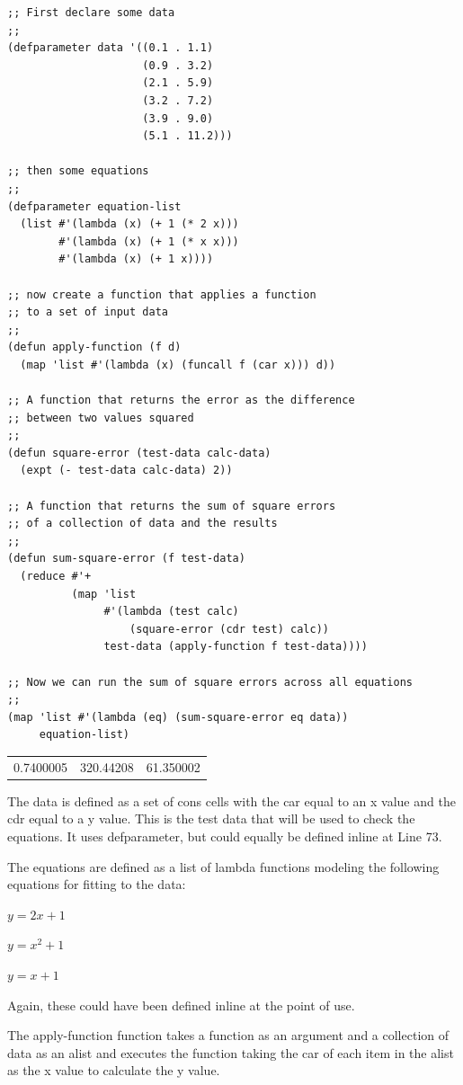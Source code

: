 \documentclass[11pt]{article}
\begin{document}
\begin{verbatim}
;; First declare some data
;;
(defparameter data '((0.1 . 1.1)
                     (0.9 . 3.2)
                     (2.1 . 5.9)
                     (3.2 . 7.2)
                     (3.9 . 9.0)
                     (5.1 . 11.2)))

;; then some equations
;;
(defparameter equation-list
  (list #'(lambda (x) (+ 1 (* 2 x)))
        #'(lambda (x) (+ 1 (* x x)))
        #'(lambda (x) (+ 1 x))))

;; now create a function that applies a function
;; to a set of input data
;;
(defun apply-function (f d)
  (map 'list #'(lambda (x) (funcall f (car x))) d))

;; A function that returns the error as the difference
;; between two values squared
;;
(defun square-error (test-data calc-data)
  (expt (- test-data calc-data) 2))

;; A function that returns the sum of square errors
;; of a collection of data and the results
;;
(defun sum-square-error (f test-data)
  (reduce #'+
          (map 'list
               #'(lambda (test calc)
                   (square-error (cdr test) calc))
               test-data (apply-function f test-data))))

;; Now we can run the sum of square errors across all equations
;;
(map 'list #'(lambda (eq) (sum-square-error eq data))
     equation-list)
\end{verbatim}
\begin{center}
\begin{tabular}{rrr}
0.7400005 & 320.44208 & 61.350002\\
\end{tabular}
\end{center}

The data is defined as a set of cons cells with the car equal to an x
value and the cdr equal to a y value. This is the test data that will
be used to check the equations. It uses defparameter, but could
equally be defined inline at Line 73.

The equations are defined as a list of lambda functions modeling the
following equations for fitting to the data:

$y=2x+1$

$y=x^2+1$

$y=x+1$

Again, these could have been defined inline at the point of use. 

The apply-function function takes a function as an argument and a
collection of data as an alist and executes the function taking the
car of each item in the alist as the x value to calculate the y value.
\end{document}
